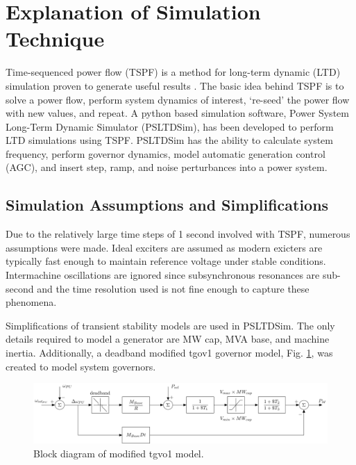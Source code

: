 \section{Explanation of Simulation Technique}
Time-sequenced power flow (TSPF) is a method for long-term dynamic (LTD) simulation proven to generate useful results \cite{DonnellyVoltageControl}.
The basic idea behind TSPF is to solve a power flow, perform system dynamics of interest, `re-seed' the power flow with new values, and repeat.
A python based simulation software, Power System Long-Term Dynamic Simulator (PSLTDSim), has been developed to perform LTD simulations using TSPF.
PSLTDSim has the ability to calculate system frequency, perform governor dynamics, model automatic generation control (AGC), and insert step, ramp, and noise perturbances into a power system.

\subsection{Simulation Assumptions and Simplifications}
Due to the relatively large time steps of 1 second involved with TSPF, numerous assumptions were made.
Ideal exciters are assumed as modern exicters are typically fast enough to maintain reference voltage under stable conditions.
Intermachine oscillations are ignored since subsynchronous resonances are sub-second and the time resolution used is not fine enough to capture these phenomena.

Simplifications of transient stability models are used in PSLTDSim.
The only details required to model a generator are MW cap, MVA base, and machine inertia.
Additionally, a deadband modified tgov1 governor model, Fig. \ref{fig: tgov1BlockDiagram},  was created to model system governors.

\begin{figure}[!ht]
	\centering
	\includegraphics[width=\linewidth]{figures/tgov1DB}
	\caption{Block diagram of modified tgvo1 model.}
	\label{fig: tgov1BlockDiagram}
\end{figure}

